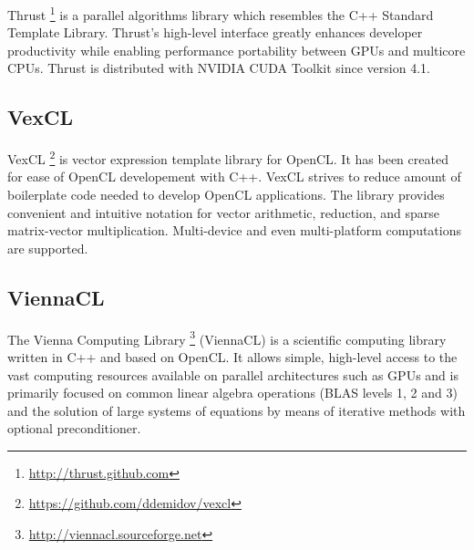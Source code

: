 \documentclass[1p]{elsarticle}
\begin{document}
Thrust%
\footnote{\href{http://thrust.github.com}{http://thrust.github.com}}
is a parallel algorithms library which resembles the C++ Standard Template
Library. Thrust's high-level interface greatly enhances developer
productivity while enabling performance portability between GPUs and multicore
CPUs. Thrust is distributed with NVIDIA CUDA Toolkit since version 4.1.

\subsection{VexCL}

VexCL%
\footnote{\href{https://github.com/ddemidov/vexcl}{https://github.com/ddemidov/vexcl}}
is vector expression template library for OpenCL. It has been created for ease
of OpenCL developement with C++.  VexCL strives to reduce amount of boilerplate
code needed to develop OpenCL applications. The library provides convenient and
intuitive notation for vector arithmetic, reduction, and sparse matrix-vector
multiplication. Multi-device and even multi-platform computations are
supported. 

\subsection{ViennaCL}

The Vienna Computing Library%
\footnote{\href{http://viennacl.sourceforge.net}{http://viennacl.sourceforge.net}}
(ViennaCL) is a scientific computing library written in C++ and based on
OpenCL. It allows simple, high-level access to the vast computing resources
available on parallel architectures such as GPUs and is primarily focused on
common linear algebra operations (BLAS levels 1, 2 and 3) and the solution of
large systems of equations by means of iterative methods with optional
preconditioner.
\end{document}
